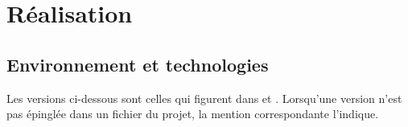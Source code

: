 \chapter{Réalisation}
\label{chap:realisation}

\section{Environnement et technologies}

Les versions ci-dessous sont celles qui figurent dans  et
. Lorsqu'une version n'est pas épinglée dans un fichier du
projet, la mention correspondante l'indique.

